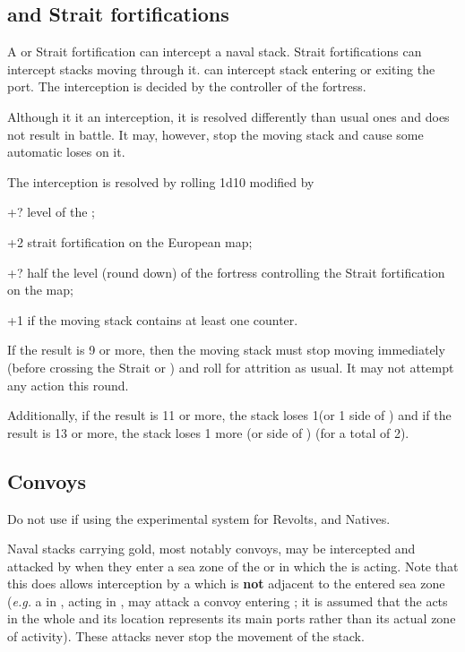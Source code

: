 \subsection{\Presidios and Strait fortifications}
A \Presidio or Strait fortification can intercept a naval stack. Strait
fortifications can intercept stacks moving through it. \Presidios can
intercept stack entering or exiting the port. The interception is decided by
the controller of the fortress.

Although it it an interception, it is resolved differently than usual ones and
does not result in battle. It may, however, stop the moving stack and cause
some automatic loses on it.

The interception is resolved by rolling 1d10 modified by
\begin{modlist}
\item[+?] level of the \Presidio;
\item[+2] strait fortification on the European map;
\item[+?] half the level (round down) of the fortress controlling the Strait
  fortification on the \ROTW map;
\item[+1] if the moving stack contains at least one \FLEET counter.
\end{modlist}

If the result is 9 or more, then the moving stack must stop moving immediately
(before crossing the Strait or \Presidio) and roll for attrition as usual. It
may not attempt any action this round.

Additionally, if the result is 11 or more, the stack loses 1\ND (or 1 side of
\corsaire) and if the result is 13 or more, the stack loses 1 more \ND (or
side of \corsaire) (for a total of 2).

\subsection{Convoys}
\begin{designnote}
  Do not use if using the experimental system for Revolts, \corsaire and
  Natives.
\end{designnote}

Naval stacks carrying gold, most notably convoys, may be intercepted and
attacked by \corsaire when they enter a sea zone of the \STZ or \CTZ in which
the \corsaire is acting. Note that this does allows interception by a
\corsaire which is \textbf{not} adjacent to the entered sea zone (\emph{e.g.}
a \corsaire in , acting in , may
attack a convoy entering \seazoneMexique; it is assumed that the \corsaire
acts in the whole \STZ and its location represents its main ports rather than
its actual zone of activity). These attacks never stop the movement of the
stack.

